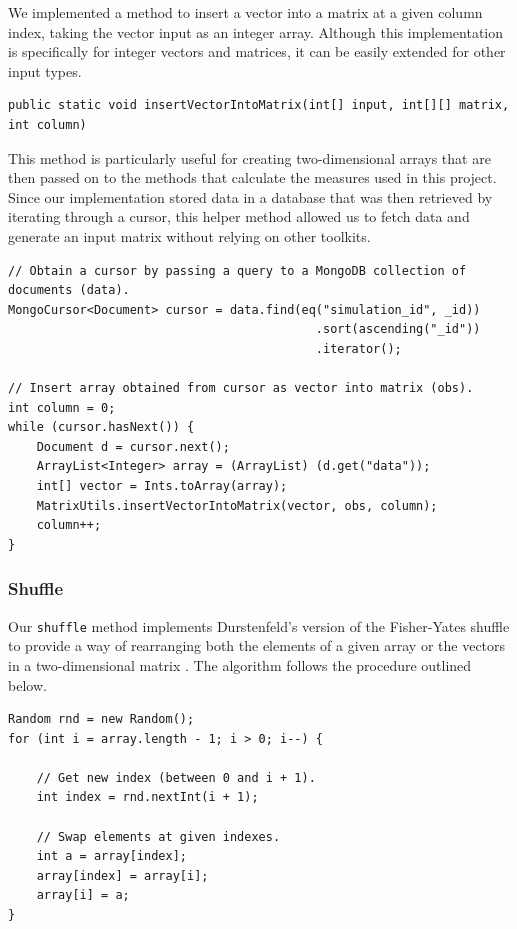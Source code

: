 \documentclass[a4paper,11pt]{article}
\begin{document}
We implemented a method to insert a vector into a matrix at a given column index, taking the vector input as an integer array. Although this implementation is specifically for integer vectors and matrices, it can be easily extended for other input types.

\begin{verbatim}
public static void insertVectorIntoMatrix(int[] input, int[][] matrix, int column)
\end{verbatim}

This method is particularly useful for creating two-dimensional arrays that are then passed on to the methods that calculate the measures used in this project. Since our implementation stored data in a database that was then retrieved by iterating through a cursor, this helper method allowed us to fetch data and generate an input matrix without relying on other toolkits.

\begin{verbatim}
// Obtain a cursor by passing a query to a MongoDB collection of documents (data).
MongoCursor<Document> cursor = data.find(eq("simulation_id", _id))
                                           .sort(ascending("_id"))
                                           .iterator();

// Insert array obtained from cursor as vector into matrix (obs).
int column = 0;
while (cursor.hasNext()) {
	Document d = cursor.next();
	ArrayList<Integer> array = (ArrayList) (d.get("data"));
	int[] vector = Ints.toArray(array);
	MatrixUtils.insertVectorIntoMatrix(vector, obs, column);
	column++;
}
\end{verbatim}

\subsubsection{Shuffle}

Our \texttt{shuffle} method implements Durstenfeld's version of the Fisher-Yates shuffle to provide a way of rearranging both the elements of a given array or the vectors in a two-dimensional matrix \cite{Durstenfeld1964}. The algorithm follows the procedure outlined below.

\begin{verbatim}
Random rnd = new Random();
for (int i = array.length - 1; i > 0; i--) {

	// Get new index (between 0 and i + 1).
	int index = rnd.nextInt(i + 1);

	// Swap elements at given indexes.
	int a = array[index];
	array[index] = array[i];
	array[i] = a;
}
\end{verbatim}
\end{document}
